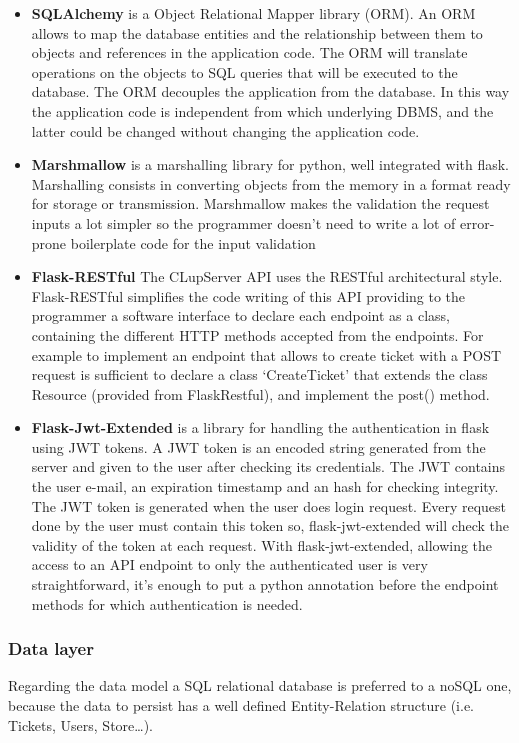 \begin{itemize}
    \item \textbf{SQLAlchemy} is a Object Relational Mapper library (ORM). An ORM allows to map the database entities and the relationship between them to objects and references in the application code. The ORM will translate operations on the objects to SQL queries that will be executed to the database. The ORM decouples the application from the database. In this way the application code is independent from which underlying DBMS, and the latter could be changed without changing the application code.
    \item \textbf{Marshmallow} is a marshalling library for python, well integrated with flask. Marshalling consists in converting objects from the memory in a format ready for storage or transmission. Marshmallow makes the validation the request inputs a lot simpler so the programmer doesn't need to write a lot of error-prone boilerplate code for the input validation
    \item \textbf{Flask-RESTful} The CLupServer API uses the RESTful architectural style. Flask-RESTful simplifies the code writing of this API providing to the programmer a software interface to declare each endpoint as a class, containing the different HTTP methods accepted from the endpoints. For example to implement an endpoint that allows to create ticket with a POST request is sufficient to declare a class `CreateTicket' that extends the class Resource (provided from FlaskRestful), and implement the post() method.
    \item \textbf{Flask-Jwt-Extended} is a library for handling the authentication in flask using JWT tokens. A JWT token is an encoded string generated from the server and given to the user after checking its credentials. The JWT contains the user e-mail, an expiration timestamp and an hash for checking integrity. The JWT token is generated when the user does login request. Every request done by the user must contain this token so, flask-jwt-extended will check the validity of the token at each request. With flask-jwt-extended, allowing the access to an API endpoint to only the authenticated user is very straightforward, it's enough to put a python annotation before the endpoint methods for which authentication is needed.
\end{itemize}
\subsubsection{Data layer}
Regarding the data model a SQL relational database is preferred to a noSQL one, because the data to persist has a well defined Entity-Relation structure (i.e. Tickets, Users, Store\ldots).

